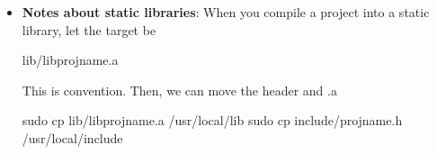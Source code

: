 \documentclass{report}
\begin{document}
\begin{itemize}
\begin{bashcode}
                    /usr/lib
                    /usr/local/lib
                    /lib
                \end{bashcode}
                \bigbreak \noindent 
                For your own manually installed library, prefer:
                \bigbreak \noindent 
                \begin{bashcode}
                    /usr/local/lib
                \end{bashcode}
                \bigbreak \noindent 
                Public headers usually go in:
                \bigbreak \noindent 
                \begin{bashcode}
                    /usr/local/include
                \end{bashcode}
                \bigbreak \noindent 
                Then you can compile with:
                \bigbreak \noindent 
                \begin{bashcode}
                gcc main.c -lmylib
                \end{bashcode}
                \bigbreak \noindent 
                If using a shared library, refresh the runtime linker cache:
                \bigbreak \noindent 
                \begin{bashcode}
                sudo ldconfig
                \end{bashcode}
                \bigbreak \noindent 
                So the usual layout is
                \bigbreak \noindent 
                \begin{bashcode}
                    /usr/local/include/may_alloc.h
                    /usr/local/lib/libmayalloc.a
                    /usr/local/lib/libmayalloc.so
                \end{bashcode}
            \item \textbf{Notes about static libraries}: When you compile a project into a static library, let the target be 
                \bigbreak \noindent 
                \begin{bashcode}
                lib/libprojname.a
                \end{bashcode}
                \bigbreak \noindent 
                This is convention.
                \bigbreak \noindent 
                Then, we can move the header and .a 
                \bigbreak \noindent 
                \begin{cppcode}
                    sudo cp lib/libprojname.a /usr/local/lib
                    sudo cp include/projname.h /usr/local/include
                \end{cppcode}

\end{itemize}
\end{document}
